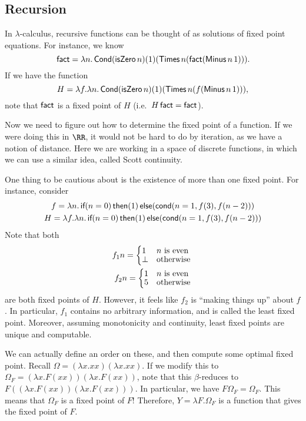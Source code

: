 \documentclass[class=scrartcl]{standalone}
\begin{document}
\subsection{Recursion}
In \(\lambda\)-calculus, recursive functions can be thought of as
solutions of fixed point equations.
For instance, we know
\[
  \textsf{fact} =
    \lambda n.
      \operatorname{\textsf{Cond}} (\operatorname{\textsf{isZero}} n)
        (1)
        (\operatorname{\textsf{Times}} n (\operatorname{\textsf{fact}} (\operatorname{\textsf{Minus}} n \, 1))).
\]
If we have the function
\[
  H = \lambda f.
    \lambda n.
      \operatorname{\textsf{Cond}} (\operatorname{\textsf{isZero}} n)
        (1)
        (\operatorname{\textsf{Times}} n (f (\operatorname{\textsf{Minus}} n\, 1))),
\]
note that \(\operatorname{\textsf{fact}}\) is a fixed point of \(H\)
(i.e.\ \(H \operatorname{\textsf{fact}} = \operatorname{\textsf{fact}}\)).

Now we need to figure out how to determine the fixed point of a function.
If we were doing this in \(\RR\), it would not be hard to do by iteration,
as we have a notion of distance.
Here we are working in a space of discrete functions,
in which we can use a similar idea, called Scott continuity.

One thing to be cautious about is the existence of more than one fixed point.
For instance, consider
\begin{gather*}
  f = \lambda n.
        \operatorname{\textsf{if}}(n = 0)
        \operatorname{\textsf{then}}(1)
        \operatorname{\textsf{else}}(\operatorname{\textsf{cond}}(n = 1, f (3), f (n - 2))) \\
  H = \lambda f. \lambda n.
        \operatorname{\textsf{if}}(n = 0)
        \operatorname{\textsf{then}}(1)
        \operatorname{\textsf{else}}(\operatorname{\textsf{cond}}(n = 1, f (3), f (n - 2)))
\end{gather*}
Note that both
\begin{align*}
  f_1 n = \begin{cases*}
    1 & \(n\) is even \\[-1ex]
    \bot & otherwise
  \end{cases*} \\
  f_2 n = \begin{cases*}
    1 & \(n\) is even \\[-1ex]
    5 & otherwise
  \end{cases*}
\end{align*}
are both fixed points of \(H\).
However, it feels like \(f_2\) is ``making things up'' about \(f\).
In particular, \(f_1\) contains no arbitrary information,
and is called the least fixed point.
Moreover, assuming monotonicity and continuity,
least fixed points are unique and computable.

We can actually define an order on these,
and then compute some optimal fixed point.
Recall \(\Omega = (\lambda x. x x)(\lambda x. x x)\).
If we modify this to \(\Omega_F = (\lambda x. F(x x))(\lambda x. F(x x))\),
note that this \(\beta\)-reduces to
\(F ((\lambda x. F(x x))(\lambda x. F(x x)))\).
In particular, we have \(F \Omega_F = \Omega_F\).
This means that \(\Omega_F\) is a fixed point of \(F\)!
Therefore, \(Y = \lambda F. \Omega_F\) is a function
that gives the fixed point of \(F\).
\end{document}
